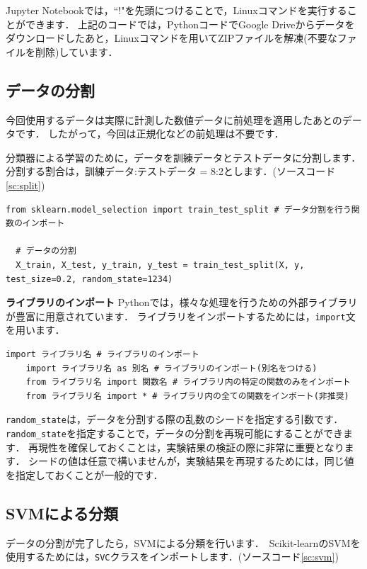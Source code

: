 \documentclass{jarticle}
\begin{document}
Jupyter Notebookでは，``!"を先頭につけることで，Linuxコマンドを実行することができます．
上記のコードでは，PythonコードでGoogle Driveからデータをダウンロードしたあと，Linuxコマンドを用いてZIPファイルを解凍(不要なファイルを削除)しています．

\subsection{データの分割}
今回使用するデータは実際に計測した数値データに前処理を適用したあとのデータです．
したがって，今回は正規化などの前処理は不要です．

分類器による学習のために，データを訓練データとテストデータに分割します．
分割する割合は，訓練データ:テストデータ = 8:2とします．(ソースコード\ref{sc:split})

\begin{lstlisting}[caption=データの分割, label=sc:split]
  from sklearn.model_selection import train_test_split # データ分割を行う関数のインポート

  # データの分割
  X_train, X_test, y_train, y_test = train_test_split(X, y, test_size=0.2, random_state=1234)
\end{lstlisting}

\begin{itembox}[l]{\textbf{ライブラリのインポート}}
  Pythonでは，様々な処理を行うための外部ライブラリが豊富に用意されています．
  ライブラリをインポートするためには，\texttt{import}文を用います．

  \begin{lstlisting}[caption={ライブラリのインポート}]
    import ライブラリ名 # ライブラリのインポート
    import ライブラリ名 as 別名 # ライブラリのインポート(別名をつける)
    from ライブラリ名 import 関数名 # ライブラリ内の特定の関数のみをインポート
    from ライブラリ名 import * # ライブラリ内の全ての関数をインポート(非推奨)
  \end{lstlisting}

\end{itembox}

\texttt{random\_state}は，データを分割する際の乱数のシードを指定する引数です．
\texttt{random\_state}を指定することで，データの分割を再現可能にすることができます．
再現性を確保しておくことは，実験結果の検証の際に非常に重要となります．
シードの値は任意で構いませんが，実験結果を再現するためには，同じ値を指定しておくことが一般的です．

\subsection{SVMによる分類}
データの分割が完了したら，SVMによる分類を行います．\
Scikit-learnのSVMを使用するためには，\texttt{SVC}クラスをインポートします．(ソースコード\ref{sc:svm})
\end{document}
